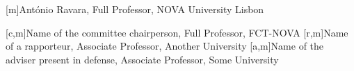 

[m]{{António Ravara, Full Professor, NOVA University Lisbon}}


[c,m]{Name of the committee chairperson, Full Professor, FCT-NOVA}
[r,m]{Name of a rapporteur, Associate Professor, Another University}
[a,m]{Name of the adviser present in defense, Associate Professor, Some University}
